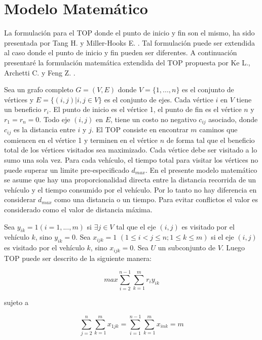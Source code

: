 \chapter{Modelo Matemático}

La formulación para el TOP donde el punto de inicio y fin son el mismo, ha sido presentada por Tang H. y Miller-Hooks E. \cite{TangMillerHooks}. Tal formulación puede ser extendida al caso donde el punto de inicio y fin pueden ser diferentes. A continuación presentaré la formulación matemática extendida del TOP propuesta por Ke L., Archetti C. y Feng Z. \cite{KeArchettiFeng}.

\bigskip

Sea un grafo completo $G=(V,E)$ donde $V=\{1,...,n\}$ es el conjunto de vértices y $E=\{(i,j)|i,j \in V\}$ es el conjunto de ejes. Cada vértice $i$ en $V$ tiene un beneficio $r_i$. El punto de inicio es el vértice 1, el punto de fin es el vértice $n$ y $r_1=r_n=0$. Todo eje $(i,j)$ en $E$, tiene un costo no negativo $c_{ij}$ asociado, donde $c_{ij}$ es la distancia entre $i$ y $j$. El TOP consiste en encontrar $m$ caminos que comiencen en el vértice 1 y terminen en el vértice $n$ de forma tal que el beneficio total de los vértices visitados sea maximizado. Cada vértice debe ser visitado a lo sumo una sola vez. Para cada vehículo, el tiempo total para visitar los vértices no puede superar un limite pre-especificado $d_{max}$. En el presente modelo matemático se asume que hay una proporcionalidad directa entre la distancia recorrida de un vehículo y el tiempo consumido por el vehículo. Por lo tanto no hay diferencia en considerar $d_{max}$ como una distancia o un tiempo. Para evitar conflictos el valor es considerado como el valor de distancia máxima.

\bigskip

Sea $y_{ik} = 1 (i = 1,...,m)$ si $\exists j \in V$ tal que el eje $(i,j)$ es visitado por el vehículo $k$, sino $y_{ik} = 0$. Sea $x_{ijk} = 1$ $(1 \leq i < j \leq n; 1 \leq k \leq m)$ si el eje $(i,j)$ es visitado por el vehículo $k$, sino $x_{ijk} = 0$. Sea $U$ un subconjunto de $V$. Luego TOP puede ser descrito de la siguiente manera:

\bigskip

\begin{equation}
max \sum_{i=2}^{n-1} \sum_{k=1}^{m} r_i y_{ik}
\end{equation}

sujeto a

\begin{equation} \label{eq:modelo2}
\sum_{j=2}^{n} \sum_{k=1}^{m} x_{1jk} = \sum_{i=1}^{n-1} \sum_{k=1}^{m} x_{ink} = m
\end{equation}

